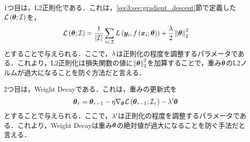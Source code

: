 1つ目は，L2正則化である．これは，\ref{sec3:sec:gradient_descent}節で定義した$\mathcal{L}\left(\bm{\theta}; \mathcal{I}\right)$を，
\begin{equation}
    \label{sec3:eq:l2_reg}
    \mathcal{L}\left(\bm{\theta}; \mathcal{I}\right) = \frac{1}{\left|\mathcal{I}\right|} \sum_{i \in \mathcal{I}} L\left(\bm{y}_{i}, f\left(\bm{x}_{i}; \bm{\theta}\right)\right) + \frac{\lambda}{2} \left\|\bm{\theta}\right\|_{2}^{2}
\end{equation}
とすることで与えられる．ここで，$\lambda$は正則化の程度を調整するパラメータである．これより，L2正則化は損失関数の値に$\left\|\bm{\theta}\right\|_{2}^{2}$を加算することで，重み$\bm{\theta}$のL2ノルムが過大になることを防ぐ方法だと言える．

2つ目は，Weight Decayである．これは，重みの更新式を
\begin{equation}
    \label{sec3:eq:weight_decay}
    \bm{\theta}_{\tau} = \bm{\theta}_{\tau - 1} - \eta \nabla_{\bm{\theta}} \mathcal{L}\left(\bm{\theta}_{\tau - 1}; \mathcal{I}_{\tau}\right) - \lambda' \bm{\theta}
\end{equation}
とすることで与えられる．ここで，$\lambda'$は正則化の程度を調整するパラメータである．これより，Weight Decayは重み$\bm{\theta}$の絶対値が過大になることを防ぐ手法だと言える．

